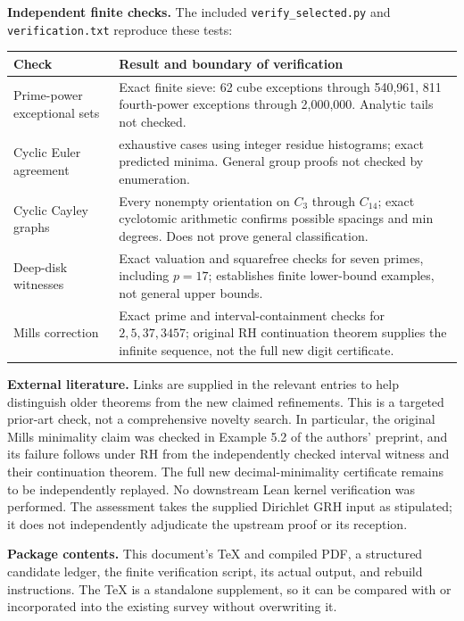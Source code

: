 \documentclass[11pt]{article}
\begin{document}
\textbf{Independent finite checks.} The included \texttt{verify\_selected.py} and \texttt{verification.txt} reproduce these tests:\par\noindent
\begin{tabularx}{\textwidth}{@{}>{\raggedright\arraybackslash}p{}>{\raggedright\arraybackslash}X@{}}\toprule
Check & Result and boundary of verification\\\midrule
Prime-power exceptional sets & Exact finite sieve: 62 cube exceptions through 540,961, 811 fourth-power exceptions through 2,000,000. Analytic tails not checked.\\
Cyclic Euler agreement & 52 exhaustive cases using integer residue histograms; exact predicted minima. General group proofs not checked by enumeration.\\
Cyclic Cayley graphs & Every nonempty orientation on $C_3$ through $C_{14}$; exact cyclotomic arithmetic confirms possible spacings and min degrees. Does not prove general classification.\\
Deep-disk witnesses & Exact valuation and squarefree checks for seven primes, including $p=17$; establishes finite lower-bound examples, not general upper bounds.\\
Mills correction & Exact prime and interval-containment checks for $2,5,37,3457$; original RH continuation theorem supplies the infinite sequence, not the full new digit certificate.\\\bottomrule
\end{tabularx}

\textbf{External literature.} Links are supplied in the relevant entries to help distinguish older theorems from the new claimed refinements. This is a targeted prior-art check, not a comprehensive novelty search. In particular, the original Mills minimality claim was checked in Example 5.2 of the authors' preprint, and its failure follows under RH from the independently checked interval witness and their continuation theorem. The full new decimal-minimality certificate remains to be independently replayed. No downstream Lean kernel verification was performed. The assessment takes the supplied Dirichlet GRH input as stipulated; it does not independently adjudicate the upstream proof or its reception.

\textbf{Package contents.} This document's TeX and compiled PDF, a structured candidate ledger, the finite verification script, its actual output, and rebuild instructions. The TeX is a standalone supplement, so it can be compared with or incorporated into the existing survey without overwriting it.
\end{document}
